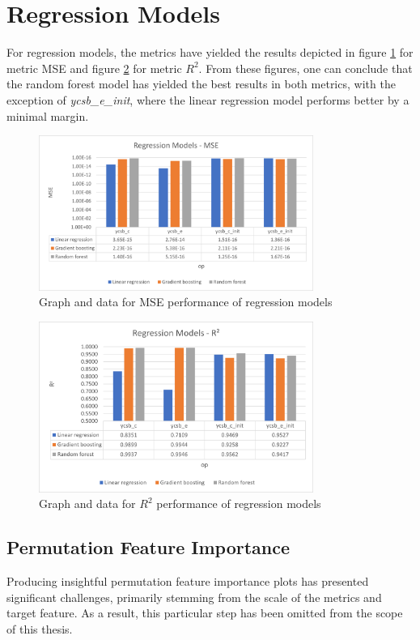\section{Regression Models}
For regression models, the metrics have yielded the results depicted in figure \ref{fig:reg_mse} for metric MSE and figure \ref{fig:reg_r2} for metric $R^2$.
From these figures, one can conclude that the random forest model has yielded the best results in both metrics, with the exception of \textit{ycsb\_e\_init}, where the linear regression model performs better by a minimal margin.
\begin{figure}[H]
      \centering
      \includegraphics[width=0.8\textwidth]{images/reg_mse.png}
      \caption{Graph and data for MSE performance of regression models}
      \label{fig:reg_mse}
  \end{figure}
\begin{figure}[H]
      \centering
      \includegraphics[width=0.8\textwidth]{images/reg_m2.png}
      \caption{Graph and data for $R^2$ performance of regression models}
      \label{fig:reg_r2}
  \end{figure}


\subsection{Permutation Feature Importance}
Producing insightful permutation feature importance plots has presented significant challenges, primarily stemming from the scale of the metrics and target feature. As a result, this particular step has been omitted from the scope of this thesis.\\

